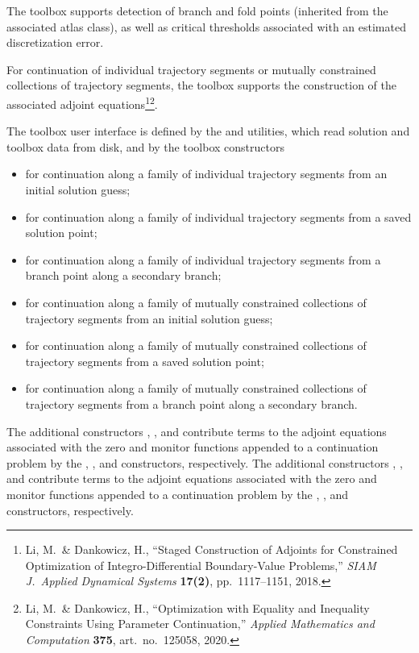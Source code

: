 The  toolbox supports detection of branch and fold points (inherited from the associated atlas class), as well as critical thresholds associated with an estimated discretization error.

For continuation of individual trajectory segments or mutually constrained collections of trajectory segments, the  toolbox supports the construction of the associated adjoint equations\footnote{Li, M.~\& Dankowicz, H., ``Staged Construction of Adjoints for Constrained Optimization of Integro-Differential Boundary-Value Problems,'' \emph{SIAM J.~Applied Dynamical Systems} \textbf{17(2)}, pp.~1117--1151, 2018.}\footnote{Li, M.~\& Dankowicz, H., ``Optimization with Equality and Inequality Constraints Using Parameter Continuation,'' \emph{Applied Mathematics and Computation} \textbf{375}, art.~no.~125058, 2020.}.

The toolbox user interface is defined by the  and  utilities, which read solution and toolbox data from disk, and by the toolbox constructors
\begin{itemize}
\item  {} for continuation along a family of individual trajectory segments from an initial solution guess;
\item {} for continuation along a family of individual trajectory segments from a saved solution point;
\item {} for continuation along a family of individual trajectory segments from a branch point along a secondary branch;
\item {} for continuation along a family of mutually constrained collections of trajectory segments from an initial solution guess;
\item {} for continuation along a family of mutually constrained collections of trajectory segments from a saved solution point;
\item {} for continuation along a family of mutually constrained collections of trajectory segments from a branch point along a secondary branch.
\end{itemize}
The additional constructors , , and  contribute terms to the adjoint equations associated with the zero and monitor functions appended to a continuation problem by the , , and  constructors, respectively.  The additional constructors , , and  contribute terms to the adjoint equations associated with the zero and monitor functions appended to a continuation problem by the , , and  constructors, respectively. 


